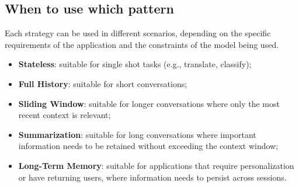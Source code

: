 \subsection{When to use which pattern}
Each strategy can be used in different scenarios, depending on the specific requirements of the application and the constraints of the model being used.
\begin{itemize}
    \item \textbf{Stateless}: suitable for single shot tasks (e.g., translate, classify);
    \item \textbf{Full History}: suitable for short conversations;
    \item \textbf{Sliding Window}: suitable for longer conversations where only the most recent context is relevant;
    \item \textbf{Summarization}: suitable for long conversations where important information needs to be retained without exceeding the context window;
    \item \textbf{Long-Term Memory}: suitable for applications that require personalization or have returning users, where information needs to persist across sessions.
\end{itemize}